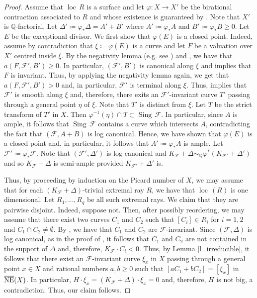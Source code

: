 \documentclass[12pt]{amsart}
\newcommand{\bb}[1]{\mathbb{#1}}
\newcommand{\sing}[1]{\operatorname{Sing} \, #1}
\newcommand{\loc}[1]{\operatorname{loc} \, #1}
\newcommand{\cal}[1]{\mathcal{#1}}
\begin{document}
\begin{proof}
Assume that $\loc R$ is a surface and let $\varphi\colon X \rightarrow X'$ be the birational contraction associated to $R$ and whose existence is guaranteed by \cite[Theorem 8.8]{CS20}. Note that $X'$ is $\mathbb Q$-factorial. 
Let $\Delta'\coloneqq \varphi_*\Delta=A'+B'$ where $A'\coloneqq \varphi_*A$   and $B'\coloneqq \varphi_*B\ge0$. 
Let $E$ be the exceptional divisor. We first show that $\varphi(E)$ is a closed point. Indeed, assume by contradiction that  $\xi\coloneq \varphi(E)$ is a curve and let $F$ be a valuation over $X'$ centred inside $\xi$. By the negativity lemma   (e.g. see \cite[Lemma 2.7]{CS20}) and \cite[Lemma 8.3]{CS20}, we have that $a(F,\mathcal F',B')\ge 0$. In particular, $(\mathcal F',B')$ is canonical along $\xi$ and \cite[Lemma 2.6]{CS20} implies that $F$ is invariant. Thus, by applying the negativity lemma again, we get that $a(F,\mathcal F',B')> 0$ and, in particular, $\cal F'$ is terminal along $\xi$. Thus, \cite[Lemma 2.9]{CS20} implies that $\cal F'$ is smooth along $\xi$ and, therefore,  there exits an $\cal F'$-invariant curve $T'$ passing through a general point $\eta$ of $\xi$. Note that $T'$ is distinct from $\xi$. Let $T$ be the strict transform of $T'$ in $X$. Then $\varphi^{-1}(\eta)\cap T\subset \sing \cal F$. In particular, since $A$ is ample, it follows that  $\sing \cal F$ contains a curve which intersects $A$, contradicting the fact that $(\cal F,A+B)$ is log canonical. Hence, we have shown that $\varphi(E)$ is a closed point and, in particular, it follows that $A'\coloneqq \varphi_*A$ is ample. 
Let $\cal F' \coloneqq \varphi_*\cal F$. Note that $(\cal F',\Delta')$ is log canonical and $K_{\cal F}+\Delta \sim_{\bb Q}  \varphi^*(K_{\cal F'}+\Delta')$ and so
$K_{\cal F}+\Delta$ is semi-ample provided $K_{\cal F'}+\Delta'$ is. 

Thus, by proceeding by induction on the Picard number of $X$, we may assume that for each $(K_{\cal F}+\Delta)$-trivial extremal ray $R$, we have that $\loc (R)$ is one dimensional. Let $R_1,\dots,R_q$ be all such extremal rays. 
 We claim that they are pairwise disjoint. Indeed, suppose not. Then, after possibly reordering, we may assume that there exist two curves $C_1$ and $C_2$ such that $[C_i]\in R_i$ for $i=1,2$ and $C_1\cap C_2\neq \emptyset$.  
By \cite[Remark 2.31]{CS20}, we have that $C_1$ and $C_2$ are $\cal F$-invariant. 
Since $(\cal F,\Delta)$ is log canonical, as in the proof of \cite[Lemma 4.7]{CS23b}, it follows that $C_1$ and $C_2$ are not contained in the support of $\Delta$ and, therefore, $K_{\cal F}\cdot C_i<0$. 
Thus, 
by Lemma \ref{l_irreducible}, it follows that there exist an $\mathcal F$-invariant curve $\xi_x$ in $X$ passing through a general point $x\in X$ and rational numbers $a,b\ge 0$ such that $[a C_1+b C_2]=[\xi_x]$ in $\overline{\rm NE}(X)$. In particular, $H\cdot \xi_x=(K_{\cal F}+\Delta)\cdot \xi_x=0$ and, therefore,  $H$ is not big, a contradiction. Thus, our claim follows. 


\end{proof}
\end{document}
